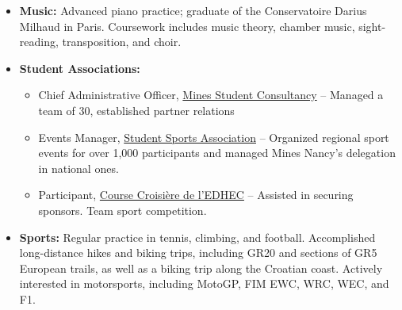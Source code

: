 \documentclass[a4paper,9pt]{extarticle}
\begin{document}
\begin{itemize}
\item \textbf{Music:} Advanced piano practice; graduate of the Conservatoire Darius Milhaud in Paris. Coursework includes music theory, chamber music, sight-reading, transposition, and choir.
\item \textbf{Student Associations:}
\begin{itemize}
\item Chief Administrative Officer, \href{https://mines-services.fr/}{Mines Student Consultancy} -- Managed a team of 30, established partner relations
\item Events Manager, \href{https://www.bdeminesnancy.com/bds}{Student Sports Association} -- Organized regional sport events for over 1,000 participants and managed Mines Nancy's delegation in national ones.
\item Participant, \href{https://cce.fr/}{Course Croisière de l’EDHEC} -- Assisted in securing sponsors. Team sport competition.
\end{itemize}
\item \textbf{Sports:} Regular practice in tennis, climbing, and football. Accomplished long-distance hikes and biking trips, including GR20 and sections of GR5 European trails, as well as a biking trip along the Croatian coast. Actively interested in motorsports, including MotoGP, FIM EWC, WRC, WEC, and F1.
\end{itemize}
\end{document}
